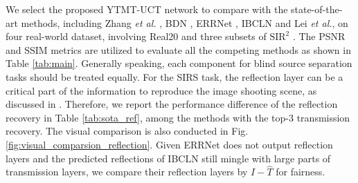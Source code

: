 \documentclass{article}
\begin{document}
\begin{table}[t]
  \centering
  \caption{Quantitative results on the testing samples from Nature dataset of different methods. The best results are highlighted in \textcolor{red}{red} and the second best results in \textcolor{blue}{blue}.}
  \label{tab:nature}
\end{table}

We select the proposed YTMT-UCT network to compare with the state-of-the-art methods, including Zhang \emph{et al.} \cite{DBLP:conf/cvpr/ZhangNC18a}, BDN \cite{DBLP:conf/eccv/YangGLS18}, ERRNet \cite{DBLP:conf/cvpr/WeiYFW019}, IBCLN \cite{DBLP:conf/cvpr/LiY0LH20} and Lei \emph{et al.}\cite{DBLP:conf/cvpr/LeiHZYSC20}, on four real-world dataset, involving Real20 \cite{DBLP:conf/cvpr/ZhangNC18a} and three subsets of $\textrm{SIR}^2$ \cite{DBLP:conf/iccv/WanSDTK17}. The PSNR and SSIM metrics are utilized to evaluate all the competing methods as shown in Table \ref{tab:main}. Generally speaking, each component for blind source separation tasks should be treated equally. For the SIRS task, the reflection layer can be a critical part of the information to reproduce the image shooting scene, as discussed in \cite{DBLP:conf/cvpr/WanSLDK20}. Therefore, we report the performance difference of the reflection recovery in Table \ref{tab:sota_ref}, among the methods with the top-3 transmission recovery. The visual comparison is also conducted in Fig. \ref{fig:visual_comparsion_reflection}. Given ERRNet does not output reflection layers and the predicted reflections of IBCLN still mingle with large parts of transmission layers, we compare their reflection layers by $I - \hat{T}$ for fairness. 
\end{document}
